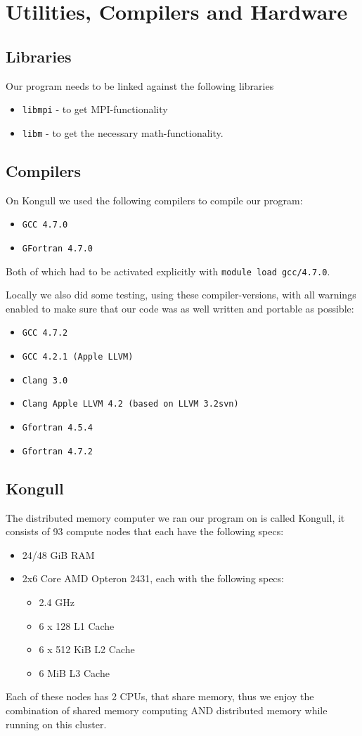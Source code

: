 \section{Utilities, Compilers and Hardware}

\subsection{Libraries}
Our program needs to be linked against the following libraries
\begin{itemize}
    \item{\texttt{libmpi}}  -  to get MPI-functionality
    \item{\texttt{libm}}  -  to get the necessary math-functionality.
\end{itemize}

\subsection{Compilers}
On Kongull we used the following compilers to compile our program:
\begin{itemize}
    \item{\texttt{GCC 4.7.0}}
    \item{\texttt{GFortran 4.7.0}}
\end{itemize}

Both of which had to be activated explicitly with \texttt{module load gcc/4.7.0}.

Locally we also did some testing, using these compiler-versions, with all warnings enabled to make sure that our code was as well written and portable as possible:
\begin{itemize}
    \item{\texttt{GCC 4.7.2}}
    \item{\texttt{GCC 4.2.1 (Apple LLVM)}}
    \item{\texttt{Clang 3.0}}
    \item{\texttt{Clang Apple LLVM 4.2 (based on LLVM 3.2svn)}}
    \item{\texttt{Gfortran 4.5.4}}
    \item{\texttt{Gfortran 4.7.2}}
\end{itemize}

\subsection{Kongull}

The distributed memory computer we ran our program on is called Kongull, it consists of 93 compute nodes that each have the following specs:
\begin{itemize}
    \item 24/48 GiB RAM
    \item 2x6 Core AMD Opteron 2431, each with the following specs:
    \begin{itemize}
        \item 2.4 GHz
        \item 6 x 128 L1 Cache
        \item 6 x 512 KiB L2 Cache
        \item 6 MiB L3 Cache
    \end{itemize}
\end{itemize}

Each of these nodes has 2 CPUs, that share memory, thus we enjoy the combination of shared memory computing AND distributed memory while
running on this cluster.